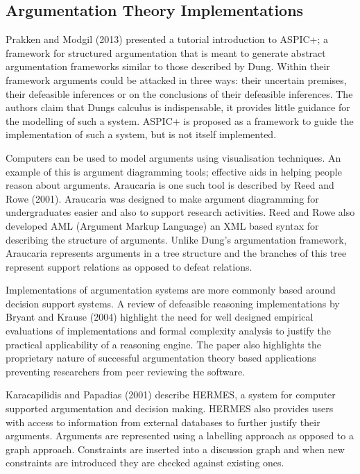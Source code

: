 \subsection{Argumentation Theory Implementations}

Prakken and Modgil (2013) presented a tutorial introduction to ASPIC+; a framework for structured argumentation that is meant to generate abstract argumentation frameworks similar to those described by Dung. Within their framework arguments could be attacked in three ways: their uncertain premises, their defeasible inferences or on the conclusions of their defeasible inferences. The authors claim that Dungs calculus is indispensable, it provides little guidance for the modelling of such a system. ASPIC+ is proposed as a framework to guide the implementation of such a system, but is not itself implemented.

Computers can be used to model arguments using visualisation techniques. An example of this is argument diagramming tools; effective aids in helping people reason about arguments. Araucaria is one such tool is described by Reed and Rowe (2001). Araucaria was designed to make argument diagramming for undergraduates easier and also to support research activities. Reed and Rowe also developed AML (Argument Markup Language) an XML based syntax for describing the structure of arguments. Unlike Dung’s argumentation framework, Araucaria represents arguments in a tree structure and the branches of this tree represent support relations as opposed to defeat relations.

Implementations of argumentation systems are more commonly based around decision support systems. A review of defeasible reasoning implementations by Bryant and Krause (2004) highlight the need for well designed empirical evaluations of implementations and formal complexity analysis to justify the practical applicability of a reasoning engine. The paper also highlights the proprietary nature of successful argumentation theory based applications preventing researchers from peer reviewing the software.

Karacapilidis and Papadias (2001) describe HERMES, a system for computer supported argumentation and decision making. HERMES also provides users with access to information from external databases to further justify their arguments. Arguments are represented using a labelling approach as opposed to a graph approach. Constraints are inserted into a discussion graph and when new constraints are introduced they are checked against existing ones.

